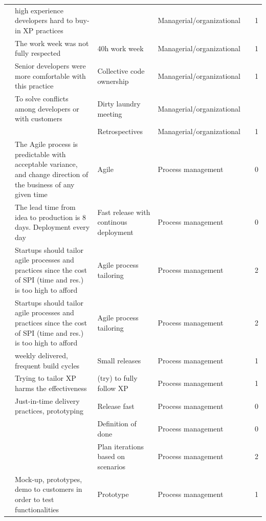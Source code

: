 \documentclass[final,5p,times,twocolumn]{elsarticle}
\begin{document}
\begin{center}
\begin{longtable}{|p{0.36in}|p{2.6in}|p{1.2in}|p{0.9in}|p{0.9in}|p{0.2in}|}
\cite{Deias} & high experience developers hard to buy-in XP practices &       & Managerial/organizational &       & 1 \\
\cite{Silva2005} & The work week was not fully respected  & 40h work week & Managerial/organizational &       & 1 \\
\cite{Silva2005} & Senior developers were more comfortable with this practice & Collective code ownership & Managerial/organizational &       & 1 \\
\cite{Silva2005} & To solve conflicts among developers or with customers & Dirty laundry meeting & Managerial/organizational &       &  \\
\cite{Silva2005} &       & Retrospectives & Managerial/organizational &       & 1 \\
\cite{Taipale2010} & The Agile process is predictable with acceptable variance, and change direction of the business of any given time & Agile & Process management &       & 0 \\
\cite{Taipale2010} & The lead time from idea to production is 8 days. Deployment every day & Fast release with continous deployment & Process management &       & 0 \\
\cite{Coleman2008} & Startups should tailor agile processes and practices since the cost of SPI (time and res.) is too high to afford & Agile process tailoring & Process management &       & 2 \\
\cite{Coleman2008a} & Startups should tailor agile processes and practices since the cost of SPI (time and res.) is too high to afford & Agile process tailoring & Process management &       & 2 \\
\cite{Tingling2007} & weekly delivered,  frequent build cycles & Small releases & Process management &       & 1 \\
\cite{Deias} & Trying to tailor XP harms the effectiveness & (try) to fully follow XP & Process management &       & 1 \\
\cite{Deakins2005} & Just-in-time delivery practices, prototyping & Release fast & Process management &       & 0 \\
\cite{Kuvinka2011} &       & Definition of done & Process management &       & 0 \\
\cite{Zettel2001} &       & Plan iterations based on scenarios & Process management &       & 2 \\
\cite{Camel1994a} & Mock-up, prototypes, demo to customers in order to test functionalities & Prototype & Process management &       & 1 \\

\end{longtable}
\end{center}
\end{document}
